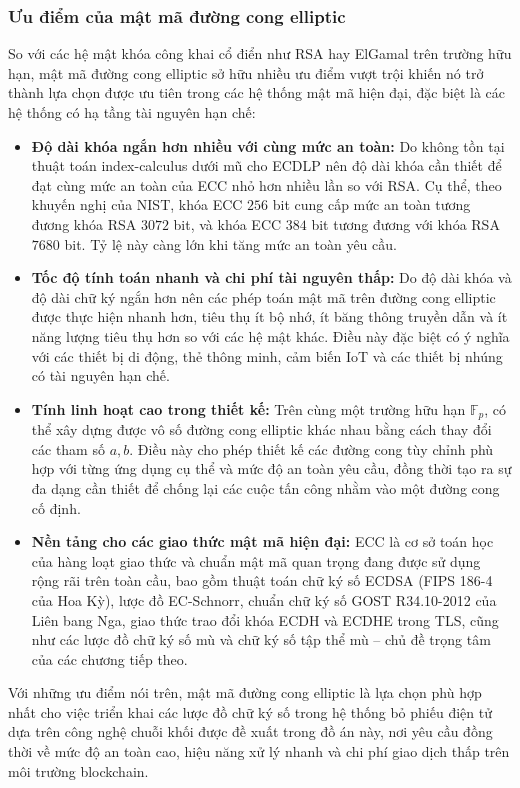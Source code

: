 \subsubsection{Ưu điểm của mật mã đường cong elliptic}

So với các hệ mật khóa công khai cổ điển như RSA hay ElGamal trên trường hữu hạn, mật mã đường cong elliptic sở hữu nhiều ưu điểm vượt trội khiến nó trở thành lựa chọn được ưu tiên trong các hệ thống mật mã hiện đại, đặc biệt là các hệ thống có hạ tầng tài nguyên hạn chế:

\begin{itemize}
    \item \textbf{Độ dài khóa ngắn hơn nhiều với cùng mức an toàn:} Do không tồn tại thuật toán index-calculus dưới mũ cho ECDLP nên độ dài khóa cần thiết để đạt cùng mức an toàn của ECC nhỏ hơn nhiều lần so với RSA. Cụ thể, theo khuyến nghị của NIST, khóa ECC $256$ bit cung cấp mức an toàn tương đương khóa RSA $3072$ bit, và khóa ECC $384$ bit tương đương với khóa RSA $7680$ bit. Tỷ lệ này càng lớn khi tăng mức an toàn yêu cầu.

    \item \textbf{Tốc độ tính toán nhanh và chi phí tài nguyên thấp:} Do độ dài khóa và độ dài chữ ký ngắn hơn nên các phép toán mật mã trên đường cong elliptic được thực hiện nhanh hơn, tiêu thụ ít bộ nhớ, ít băng thông truyền dẫn và ít năng lượng tiêu thụ hơn so với các hệ mật khác. Điều này đặc biệt có ý nghĩa với các thiết bị di động, thẻ thông minh, cảm biến IoT và các thiết bị nhúng có tài nguyên hạn chế.

    \item \textbf{Tính linh hoạt cao trong thiết kế:} Trên cùng một trường hữu hạn $\mathbb{F}_p$, có thể xây dựng được vô số đường cong elliptic khác nhau bằng cách thay đổi các tham số $a, b$. Điều này cho phép thiết kế các đường cong tùy chỉnh phù hợp với từng ứng dụng cụ thể và mức độ an toàn yêu cầu, đồng thời tạo ra sự đa dạng cần thiết để chống lại các cuộc tấn công nhằm vào một đường cong cố định.

    \item \textbf{Nền tảng cho các giao thức mật mã hiện đại:} ECC là cơ sở toán học của hàng loạt giao thức và chuẩn mật mã quan trọng đang được sử dụng rộng rãi trên toàn cầu, bao gồm thuật toán chữ ký số ECDSA (FIPS 186-4 của Hoa Kỳ), lược đồ EC-Schnorr, chuẩn chữ ký số GOST R34.10-2012 của Liên bang Nga, giao thức trao đổi khóa ECDH và ECDHE trong TLS, cũng như các lược đồ chữ ký số mù và chữ ký số tập thể mù -- chủ đề trọng tâm của các chương tiếp theo.
\end{itemize}

Với những ưu điểm nói trên, mật mã đường cong elliptic là lựa chọn phù hợp nhất cho việc triển khai các lược đồ chữ ký số trong hệ thống bỏ phiếu điện tử dựa trên công nghệ chuỗi khối được đề xuất trong đồ án này, nơi yêu cầu đồng thời về mức độ an toàn cao, hiệu năng xử lý nhanh và chi phí giao dịch thấp trên môi trường blockchain.
